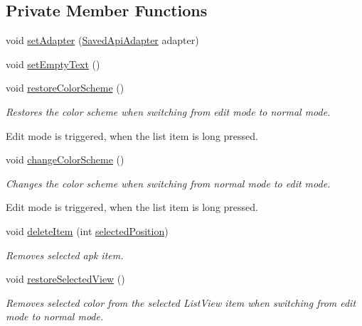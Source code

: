\subsection*{Private Member Functions}
\begin{DoxyCompactItemize}
\item 
void \hyperlink{classorg_1_1buildmlearn_1_1toolkit_1_1fragment_1_1LoadApkFragment_a61345103bca3d4f7ae96b784caf4fd27}{set\+Adapter} (\hyperlink{classorg_1_1buildmlearn_1_1toolkit_1_1adapter_1_1SavedApiAdapter}{Saved\+Api\+Adapter} adapter)
\item 
void \hyperlink{classorg_1_1buildmlearn_1_1toolkit_1_1fragment_1_1LoadApkFragment_a1dbcd8c28e67b529eac66ccd46c4e55b}{set\+Empty\+Text} ()
\item 
void \hyperlink{classorg_1_1buildmlearn_1_1toolkit_1_1fragment_1_1LoadApkFragment_a7099265fa87e804008541c5500a6106a}{restore\+Color\+Scheme} ()
\begin{DoxyCompactList}\small\item\em Restores the color scheme when switching from edit mode to normal mode. 

Edit mode is triggered, when the list item is long pressed. \end{DoxyCompactList}\item 
void \hyperlink{classorg_1_1buildmlearn_1_1toolkit_1_1fragment_1_1LoadApkFragment_a2234406f2275e3a8519c00e9850265d7}{change\+Color\+Scheme} ()
\begin{DoxyCompactList}\small\item\em Changes the color scheme when switching from normal mode to edit mode. 

Edit mode is triggered, when the list item is long pressed. \end{DoxyCompactList}\item 
void \hyperlink{classorg_1_1buildmlearn_1_1toolkit_1_1fragment_1_1LoadApkFragment_a1184ed90defdf6cfe7274640d6b87b09}{delete\+Item} (int \hyperlink{classorg_1_1buildmlearn_1_1toolkit_1_1fragment_1_1LoadApkFragment_a41fead0d2295b8fd7f2f7bfb168470d7}{selected\+Position})
\begin{DoxyCompactList}\small\item\em Removes selected apk item. \end{DoxyCompactList}\item 
void \hyperlink{classorg_1_1buildmlearn_1_1toolkit_1_1fragment_1_1LoadApkFragment_abfc6cdd1549da6772a8ca130a938166b}{restore\+Selected\+View} ()
\begin{DoxyCompactList}\small\item\em Removes selected color from the selected List\+View item when switching from edit mode to normal mode. \end{DoxyCompactList}\end{DoxyCompactItemize}
